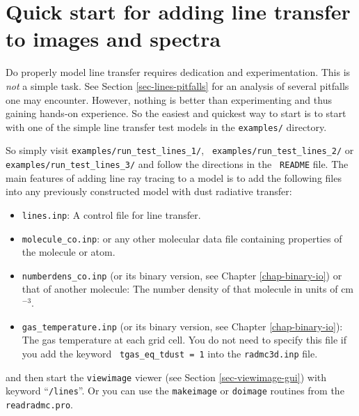\documentclass{report}
\begin{document}
\section{Quick start for adding line transfer to images and spectra}
Do properly model line transfer requires dedication and experimentation.
This is {\em not} a simple task. See Section \ref{sec-lines-pitfalls} for an
analysis of several pitfalls one may encounter. However, nothing is better
than experimenting and thus gaining hands-on experience. So the easiest and
quickest way to start is to start with one of the simple line transfer test
models in the {\small\tt examples/} directory. 

So simply visit {\small\tt examples/run\_test\_lines\_1/}, {\small\tt
  examples/run\_test\_lines\_2/} or {\small\tt
  examples/run\_test\_lines\_3/} and follow the directions in the {\small\tt
  README} file. The main features of adding line ray tracing to a model is
to add the following files into any previously constructed model with dust
radiative transfer:
\begin{itemize}
\item {\small\tt lines.inp}: A control file for line transfer. 
\item {\small\tt molecule\_co.inp}: or any other molecular data file
  containing properties of the molecule or atom.
\item {\small\tt numberdens\_co.inp} (or its binary version, see Chapter
  \ref{chap-binary-io}) or that of another molecule: The number density of
  that molecule in units of cm$^{-3}$.
\item {\small\tt gas\_temperature.inp} (or its binary version, see Chapter
  \ref{chap-binary-io}): The gas temperature at each grid cell. You do not
  need to specify this file if you add the keyword {\small\tt
    tgas\_eq\_tdust = 1} into the {\small\tt radmc3d.inp} file.
\end{itemize}
and then start the {\small\tt viewimage} viewer (see Section
\ref{sec-viewimage-gui}) with keyword ``{\small\tt /lines}''. Or you can use
the {\small\tt makeimage} or {\small\tt doimage} routines from the
{\small\tt readradmc.pro}.
\end{document}
